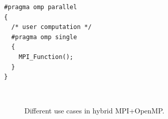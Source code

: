\newsavebox\mpiInsideSingleBox
\begin{lrbox}{\mpiInsideSingleBox}
\begin{lstlisting}[linewidth=0.45\columnwidth]
#pragma omp parallel
{
  /* user computation */
  #pragma omp single
  {
    MPI_Function();
  }
}
\end{lstlisting}
\end{lrbox}

\begin{figure}%
\setlength{\subfigcapskip}{5pt}
\centering
{}
\hfill
{}
\\
\vspace{3.0ex}
\hfill
{}
\caption{Different use cases in hybrid MPI+OpenMP.}
\label{fig:code_omp}
\end{figure}

